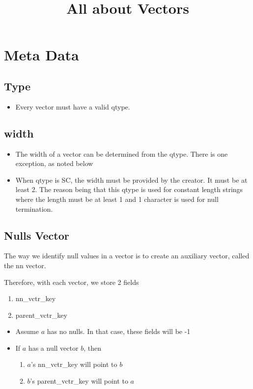 \documentclass[letterpaper,12pt]{article}
\newcommand{\be}{\begin{enumerate}}
\newcommand{\ee}{\end{enumerate}}
\newcommand{\bi}{\begin{itemize}}
\newcommand{\ei}{\end{itemize}}
\begin{document}
\title{All about Vectors}
\maketitle
\thispagestyle{fancy}
\lhead{}
\chead{}
\rhead{}
\cfoot{}
\rfoot{{\small \thepage}}


\section{Meta Data}
\subsection{Type}
\label{qtype}

\bi
\item Every vector must have a valid qtype. 
\ei

\subsection{width}
\label{width}
\bi
\item The width of a vector can be determined from the qtype. There is one
exception, as noted below
\item When qtype is SC, the width must be provided by the creator. It must be at
least 2. The reason being that this qtype is used for constant length strings
where the length must be at least 1 and 1 character is used for null
termination. 
\ei

\subsection{Nulls Vector}
\label{nn_vector}

The way we identify null values in a vector is to create an auxiliary 
vector, called the nn vector. 

Therefore, with each vector, we store 2 fields
\be
\item nn\_vctr\_key
\item parent\_vctr\_key
  \ee

\bi
\item Assume \(a\) has no nulls. In that case, these fields will be -1 
\item If \(a\) has a null vector \(b\), then 
  \be
\item \(a\)'s nn\_vctr\_key will point to \(b\) 
\item \(b\)'s parent\_vctr\_key will point to \(a\) 
  \ee
  \ei
\end{document}

